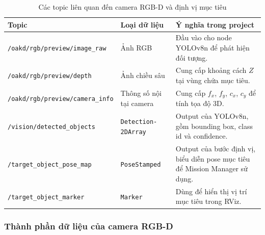 \begin{table}[H]
    \centering
    \caption{Các topic liên quan đến camera RGB-D và định vị mục tiêu}
    \label{tab:rgbd-topics}
    \renewcommand{\arraystretch}{1.25}
    \small
    \begin{tabularx}{\textwidth}{|>{\raggedright\arraybackslash}p{}|>{\raggedright\arraybackslash}p{}|>{\raggedright\arraybackslash}X|}
        \hline
        \textbf{Topic} & \textbf{Loại dữ liệu} & \textbf{Ý nghĩa trong project} \\
        \hline
        \texttt{/oakd/rgb/preview/}\newline\texttt{image\_raw} & Ảnh RGB & Đầu vào cho node YOLOv8n để phát hiện đối tượng. \\
        \hline
        \texttt{/oakd/rgb/preview/}\newline\texttt{depth} & Ảnh chiều sâu & Cung cấp khoảng cách $Z$ tại vùng chứa mục tiêu. \\
        \hline
        \texttt{/oakd/rgb/preview/}\newline\texttt{camera\_info} & Thông số nội tại camera & Cung cấp $f_x$, $f_y$, $c_x$, $c_y$ để tính tọa độ 3D. \\
        \hline
        \texttt{/vision/}\newline\texttt{detected\_objects} & \texttt{Detection-}\newline\texttt{2DArray} & Output của YOLOv8n, gồm bounding box, class id và confidence. \\
        \hline
        \texttt{/target\_object\_pose\_map} & \texttt{PoseStamped} & Output của bước định vị, biểu diễn pose mục tiêu để Mission Manager sử dụng. \\
        \hline
        \texttt{/target\_object\_marker} & \texttt{Marker} & Dùng để hiển thị vị trí mục tiêu trong RViz. \\
        \hline
    \end{tabularx}
\end{table}

\subsubsection{Thành phần dữ liệu của camera RGB-D}
\label{subsubsec:rgbd-components}

